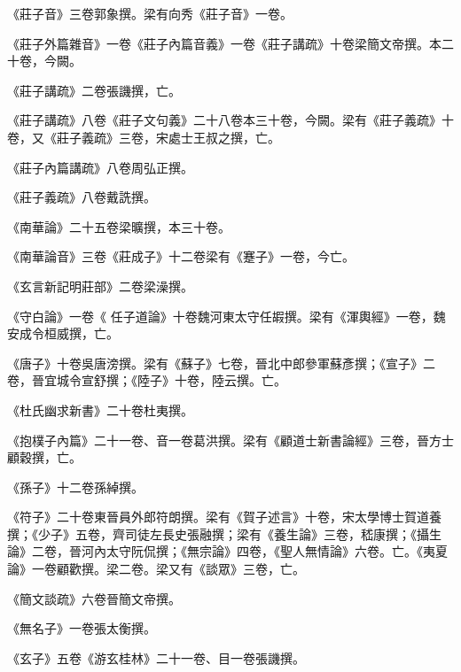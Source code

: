\begin{pinyinscope}
 《莊子音》三卷郭象撰。梁有向秀《莊子音》一卷。



 《莊子外篇雜音》一卷《莊子內篇音義》一卷《莊子講疏》十卷梁簡文帝撰。本二十卷，今闕。



 《莊子講疏》二卷張譏撰，亡。



 《莊子講疏》八卷《莊子文句義》二十八卷本三十卷，今闕。梁有《莊子義疏》十卷，又《莊子義疏》三卷，宋處士王叔之撰，亡。



 《莊子內篇講疏》八卷周弘正撰。



 《莊子義疏》八卷戴詵撰。



 《南華論》二十五卷梁曠撰，本三十卷。



 《南華論音》三卷《莊成子》十二卷梁有《蹇子》一卷，今亡。



 《玄言新記明莊部》二卷梁澡撰。



 《守白論》一卷《
 任子道論》十卷魏河東太守任嘏撰。梁有《渾輿經》一卷，魏安成令桓威撰，亡。



 《唐子》十卷吳唐滂撰。梁有《蘇子》七卷，晉北中郎參軍蘇彥撰；《宣子》二卷，晉宜城令宣舒撰；《陸子》十卷，陸云撰。亡。



 《杜氏幽求新書》二十卷杜夷撰。



 《抱樸子內篇》二十一卷、音一卷葛洪撰。梁有《顧道士新書論經》三卷，晉方士顧穀撰，亡。



 《孫子》十二卷孫綽撰。



 《符子》二十卷東晉員外郎符朗撰。梁有《賀子述言》十卷，宋太學博士賀道養撰；《少子》五卷，齊司徒左長史張融撰；梁有《養生論》三卷，嵇康撰；《攝生論》二卷，晉河內太守阮侃撰；《無宗論》四卷，《聖人無情論》六卷。亡。《夷夏論》一卷顧歡撰。梁二卷。梁又有《談眾》三卷，亡。



 《簡文談疏》六卷晉簡文帝撰。



 《無名子》一卷張太衡撰。



 《玄子》五卷《游玄桂林》二十一卷、目一卷張譏撰。




\end{pinyinscope}
